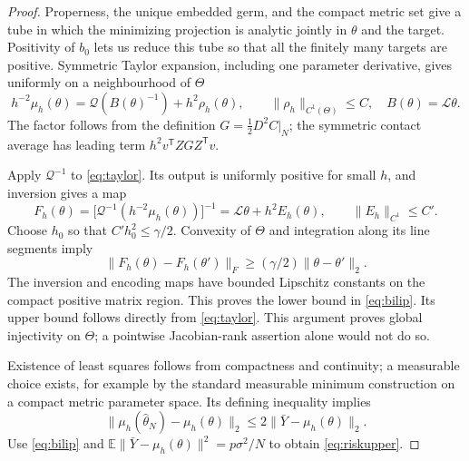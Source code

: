 \documentclass[11pt,reqno]{amsart}
\numberwithin{equation}{section}
\theoremstyle{definition}\newtheorem{definition}[theorem]{Definition}
\theoremstyle{remark}\newtheorem{remark}[theorem]{Remark}
\newcommand{\cL}{\mathcal L}
\begin{document}
\begin{proof}
Properness, the unique embedded germ, and the compact metric set give a tube in which the minimizing projection is analytic jointly in $\theta$ and the target. Positivity of $b_0$ lets us reduce this tube so that all the finitely many targets are positive. Symmetric Taylor expansion, including one parameter derivative, gives uniformly on a neighbourhood of $\Theta$
\begin{equation}\label{eq:taylor}
 h^{-2}\mu_h(\theta)
 =\mathcal Q(B(\theta)^{-1})+h^2\rho_h(\theta),
 \qquad \|\rho_h\|_{C^1(\Theta)}\le C,
 \quad B(\theta)=\cL\theta.
\end{equation}
The factor follows from the definition $G=\tfrac12D^2C|_N$; the symmetric contact average has leading term $h^2v^{\mathsf T}Z G Z^{\mathsf T}v$.

Apply $\mathcal Q^{-1}$ to \eqref{eq:taylor}. Its output is uniformly positive for small $h$, and inversion gives a map
\[
 F_h(\theta)=\big[\mathcal Q^{-1}(h^{-2}\mu_h(\theta))\big]^{-1}
            =\cL\theta+h^2E_h(\theta),\qquad \|E_h\|_{C^1}\le C'.
\]
Choose $h_0$ so that $C'h_0^2\le\gamma/2$. Convexity of $\Theta$ and integration along its line segments imply
\[
 \|F_h(\theta)-F_h(\theta')\|_F\ge(\gamma/2)\|\theta-\theta'\|_2.
\]
The inversion and encoding maps have bounded Lipschitz constants on the compact positive matrix region. This proves the lower bound in \eqref{eq:bilip}. Its upper bound follows directly from \eqref{eq:taylor}. This argument proves global injectivity on $\Theta$; a pointwise Jacobian-rank assertion alone would not do so.

Existence of least squares follows from compactness and continuity; a measurable choice exists, for example by the standard measurable minimum construction on a compact metric parameter space. Its defining inequality implies
\[
 \|\mu_h(\widehat\theta_N)-\mu_h(\theta)\|_2
 \le2\|\bar Y-\mu_h(\theta)\|_2.
\]
Use \eqref{eq:bilip} and $\mathbb E\|\bar Y-\mu_h(\theta)\|^2=p\sigma^2/N$ to obtain \eqref{eq:riskupper}.


\end{proof}
\end{document}
